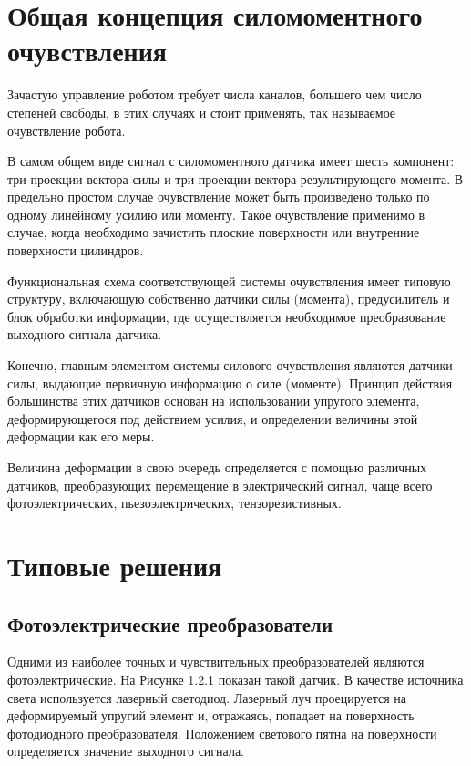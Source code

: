 \documentclass[a4paper,14pt,russian]{extreport} \usepackage{extsizes}
\begin{document}
	\section {Общая концепция силомоментного очувствления}
	Зачастую управление роботом требует числа каналов, большего чем число степеней свободы, в этих случаях и стоит применять, так называемое очувствление робота. 
	
	В самом общем виде сигнал с силомоментного датчика имеет шесть компонент: три проекции вектора силы и три проекции вектора результирующего момента.
	В предельно	простом случае очувствление может быть произведено только по
	одному линейному усилию или моменту. Такое очувствление применимо в случае, когда необходимо зачистить плоские поверхности или внутренние поверхности цилиндров.
	
	Функциональная схема соответствующей системы очувствления имеет типовую структуру, включающую собственно датчики силы (момента), предусилитель и блок обработки информации, где	осуществляется необходимое преобразование выходного сигнала датчика.
	
	Конечно, главным элементом системы силового очувствления
	являются датчики силы, выдающие первичную информацию о силе
	(моменте). Принцип действия большинства этих датчиков основан
	на использовании упругого элемента, деформирующегося под
	действием усилия, и определении величины этой деформации как
	его меры.
	
	Величина деформации в свою очередь определяется с помощью
	различных датчиков, преобразующих перемещение в электрический сигнал, чаще всего фотоэлектрических, пьезоэлектрических, тензорезистивных.
	\section {Типовые решения}
	\subsection {Фотоэлектрические преобразователи}
	Одними из наиболее точных и чувствительных преобразователей являются  фотоэлектрические. На Рисунке 1.2.1 показан	такой датчик. В качестве источника света используется лазерный светодиод. Лазерный луч проецируется на деформируемый упругий
	элемент и, отражаясь, попадает на поверхность фотодиодного
	преобразователя. Положением светового пятна на поверхности определяется значение выходного сигнала.
\end{document}
